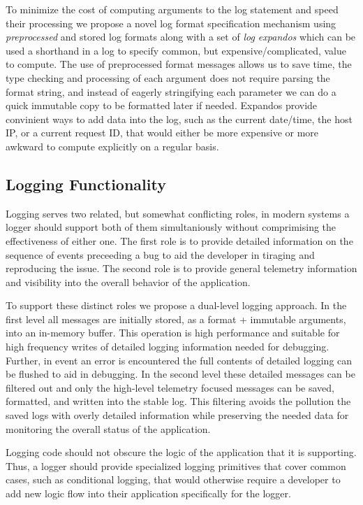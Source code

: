 To minimize the cost of computing arguments to the log statement and speed their 
processing we propose a novel log format specification mechanism using 
\emph{preprocessed} and stored log formats along with a set of \emph{log expandos} 
which can be used a shorthand in a log to specify common, but expensive/complicated, 
value to compute. The use of preprocessed format messages allows us to save time, 
the type checking and processing of each argument does not require parsing the 
format string, and instead of eagerly stringifying each parameter we can do a quick 
immutable copy to be formatted later if needed. Expandos provide convinient 
ways to add data into the log, such as the current date/time, the host IP, or a 
current request ID, that would either be more expensive or more awkward to compute 
explicitly on a regular basis.

\subsection{Logging Functionality}
\label{subsec:functionalitydesign}
\begin{design}
Logging serves two related, but somewhat conflicting roles, in modern systems 
a logger should support both of them simultaniously without comprimising the 
effectiveness of either one. The first role is to provide detailed information 
on the sequence of events preceeding a bug to aid the developer in tiraging and 
reproducing the issue. The second role is to provide general telemetry 
information and visibility into the overall behavior of the application. 
\end{design}

To support these distinct roles we propose a dual-level logging approach. In the 
first level all messages are initially stored, as a format + immutable 
arguments, into an in-memory buffer. This operation is high performance and 
suitable for high frequency writes of detailed logging information needed for 
debugging. Further, in event an error is encountered the full contents of 
detailed logging can be flushed to aid in debugging. In the second level these 
detailed messages can be filtered out and only the high-level telemetry focused 
messages can be saved, formatted, and written into the stable log. This filtering 
avoids the pollution the saved logs with overly detailed information while 
preserving the needed data for monitoring the overall status of the application. 

\begin{design}
Logging code should not obscure the logic of the application that it is 
supporting. Thus, a logger should provide specialized logging primitives 
that cover common cases, such as conditional logging, that would otherwise 
require a developer to add new logic flow into their application specifically 
for the logger.
\end{design}

